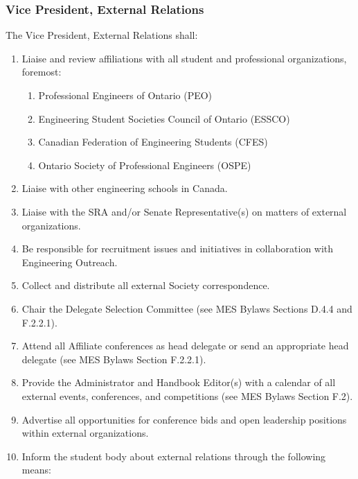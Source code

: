 \hypertarget{vice-president-external-relations}{%
 \subsubsection{Vice President, External
  Relations}
 \label{vice-president-external-relations}}
The Vice President, External Relations shall:

\begin{enumerate}
 \item
  Liaise and review affiliations with all student and professional
  organizations, foremost:

  \begin{enumerate}
   \item
    Professional Engineers of Ontario (PEO)
   \item
    Engineering Student Societies Council of Ontario (ESSCO)
   \item
    Canadian Federation of Engineering Students (CFES)
   \item
    Ontario Society of Professional Engineers (OSPE)
  \end{enumerate}
 \item
  Liaise with other engineering schools in Canada.
 \item
  Liaise with the SRA and/or Senate Representative(s) on matters of
  external organizations.
 \item
  Be responsible for recruitment issues and initiatives in collaboration
  with Engineering Outreach.
 \item
  Collect and distribute all external Society correspondence.
 \item
  Chair the Delegate Selection Committee (see MES Bylaws Sections D.4.4
  and F.2.2.1).
 \item
  Attend all Affiliate conferences as head delegate or send an
  appropriate head delegate (see MES Bylaws Section F.2.2.1).
 \item
  Provide the Administrator and Handbook Editor(s) with a calendar of
  all external events, conferences, and competitions (see MES Bylaws
  Section F.2).
 \item
  Advertise all opportunities for conference bids and open leadership
  positions within external organizations.
 \item
  Inform the student body about external relations through the following
  means:


\end{enumerate}

